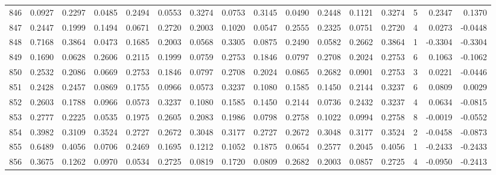 \begin{tabular}{lrrrrrrrrrrrrrrr}
846 &      0.0927 &  0.2297 &  0.0485 &  0.2494 &  0.0553 &  0.3274 &  0.0753 &  0.3145 &  0.0490 &  0.2448 &   0.1121 &     0.3274 &      5 &                    0.2347 &                     0.1370 \\
847 &      0.2447 &  0.1999 &  0.1494 &  0.0671 &  0.2720 &  0.2003 &  0.1020 &  0.0547 &  0.2555 &  0.2325 &   0.0751 &     0.2720 &      4 &                    0.0273 &                    -0.0448 \\
848 &      0.7168 &  0.3864 &  0.0473 &  0.1685 &  0.2003 &  0.0568 &  0.3305 &  0.0875 &  0.2490 &  0.0582 &   0.2662 &     0.3864 &      1 &                   -0.3304 &                    -0.3304 \\
849 &      0.1690 &  0.0628 &  0.2606 &  0.2115 &  0.1999 &  0.0759 &  0.2753 &  0.1846 &  0.0797 &  0.2708 &   0.2024 &     0.2753 &      6 &                    0.1063 &                    -0.1062 \\
850 &      0.2532 &  0.2086 &  0.0669 &  0.2753 &  0.1846 &  0.0797 &  0.2708 &  0.2024 &  0.0865 &  0.2682 &   0.0901 &     0.2753 &      3 &                    0.0221 &                    -0.0446 \\
851 &      0.2428 &  0.2457 &  0.0869 &  0.1755 &  0.0966 &  0.0573 &  0.3237 &  0.1080 &  0.1585 &  0.1450 &   0.2144 &     0.3237 &      6 &                    0.0809 &                     0.0029 \\
852 &      0.2603 &  0.1788 &  0.0966 &  0.0573 &  0.3237 &  0.1080 &  0.1585 &  0.1450 &  0.2144 &  0.0736 &   0.2432 &     0.3237 &      4 &                    0.0634 &                    -0.0815 \\
853 &      0.2777 &  0.2225 &  0.0535 &  0.1975 &  0.2605 &  0.2083 &  0.1986 &  0.0798 &  0.2758 &  0.1022 &   0.0994 &     0.2758 &      8 &                   -0.0019 &                    -0.0552 \\
854 &      0.3982 &  0.3109 &  0.3524 &  0.2727 &  0.2672 &  0.3048 &  0.3177 &  0.2727 &  0.2672 &  0.3048 &   0.3177 &     0.3524 &      2 &                   -0.0458 &                    -0.0873 \\
855 &      0.6489 &  0.4056 &  0.0706 &  0.2469 &  0.1695 &  0.1212 &  0.1052 &  0.1875 &  0.0654 &  0.2577 &   0.2045 &     0.4056 &      1 &                   -0.2433 &                    -0.2433 \\
856 &      0.3675 &  0.1262 &  0.0970 &  0.0534 &  0.2725 &  0.0819 &  0.1720 &  0.0809 &  0.2682 &  0.2003 &   0.0857 &     0.2725 &      4 &                   -0.0950 &                    -0.2413 \\

\end{tabular}
